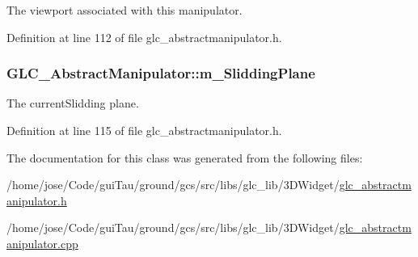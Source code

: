 The viewport associated with this manipulator. 



Definition at line 112 of file glc\-\_\-abstractmanipulator.\-h.

\hypertarget{class_g_l_c___abstract_manipulator_a49a526b5e0fccbb46e812ca8d609d56f}{
\subsubsection[{m\-\_\-\-Slidding\-Plane}]{ G\-L\-C\-\_\-\-Abstract\-Manipulator\-::m\-\_\-\-Slidding\-Plane\hspace{0.3cm}{\ttfamily [protected]}}}\label{class_g_l_c___abstract_manipulator_a49a526b5e0fccbb46e812ca8d609d56f}


The current\-Slidding plane. 



Definition at line 115 of file glc\-\_\-abstractmanipulator.\-h.



The documentation for this class was generated from the following files\-:\begin{DoxyCompactItemize}
\item 
/home/jose/\-Code/gui\-Tau/ground/gcs/src/libs/glc\-\_\-lib/3\-D\-Widget/\hyperlink{glc__abstractmanipulator_8h}{glc\-\_\-abstractmanipulator.\-h}\item 
/home/jose/\-Code/gui\-Tau/ground/gcs/src/libs/glc\-\_\-lib/3\-D\-Widget/\hyperlink{glc__abstractmanipulator_8cpp}{glc\-\_\-abstractmanipulator.\-cpp}\end{DoxyCompactItemize}
